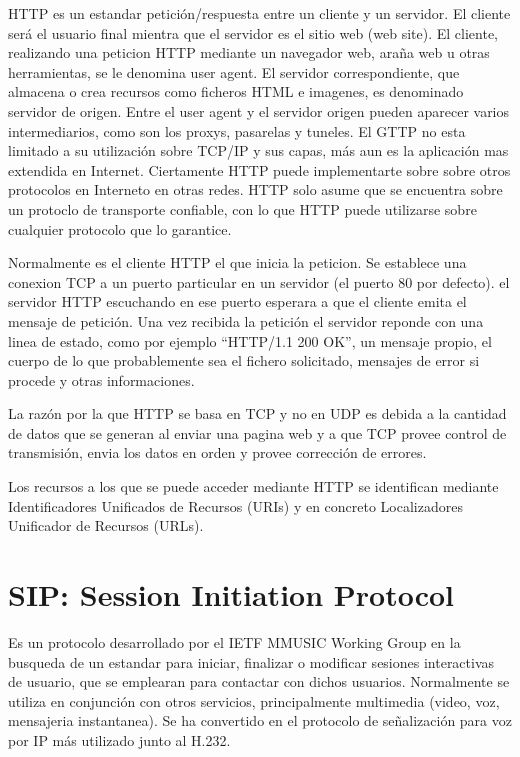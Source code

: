 \documentclass[a4paper,spanish,12pt]{book}
\begin{document}
HTTP es un estandar petición/respuesta entre un cliente y un servidor. El cliente será el usuario final mientra que el servidor es el sitio web (web site). El cliente, realizando una peticion HTTP mediante un navegador web, araña web u otras herramientas, se le denomina user agent. El servidor correspondiente, que almacena o crea recursos como ficheros HTML e imagenes, es denominado servidor de origen. Entre el user agent y el servidor origen pueden aparecer varios intermediarios, como son los proxys, pasarelas y tuneles. El GTTP no esta limitado a su utilización sobre TCP/IP y sus capas, más aun es la aplicación mas extendida en Internet. Ciertamente HTTP puede implementarte sobre sobre otros protocolos en Interneto en otras redes. HTTP solo asume que se encuentra sobre un protoclo de transporte confiable, con lo que HTTP puede utilizarse sobre cualquier protocolo que lo garantice.

Normalmente es el cliente HTTP el que inicia la peticion. Se establece una conexion TCP a un puerto particular en un servidor (el puerto 80 por defecto). el servidor HTTP escuchando en ese puerto esperara a que el cliente emita el mensaje de petición. Una vez recibida la petición el servidor reponde con una linea de estado, como por ejemplo ``HTTP/1.1 200 OK'',  un mensaje propio, el cuerpo de lo que probablemente sea el fichero solicitado, mensajes de error si procede y otras informaciones.

La razón por la que HTTP se basa en TCP y no en UDP es debida a la cantidad de datos que se generan al enviar una pagina web y a que TCP provee control de transmisión, envia los datos en orden y provee corrección de errores.

Los recursos a los que se puede acceder mediante HTTP se identifican mediante Identificadores Unificados de Recursos (URIs) y en concreto Localizadores Unificador de Recursos (URLs).


\section{SIP: Session Initiation Protocol} 

Es un protocolo desarrollado por el IETF MMUSIC Working Group en la busqueda de un estandar para iniciar, finalizar o modificar sesiones interactivas de usuario, que se emplearan para contactar con dichos usuarios. Normalmente se utiliza en conjunción con otros servicios, principalmente multimedia (video, voz, mensajeria instantanea). Se ha convertido en el protocolo de señalización para voz por IP más utilizado junto al H.232.
\end{document}
